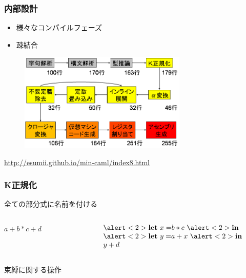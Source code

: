 \documentclass[dvipdfmx,cjk,xcolor=dvipsnames,envcountsect,notheorems,12pt]{beamer}
\theoremstyle{definition}
\newcommand{\keyword}[1]{\mathbf{#1}}
\newcommand{\LET}{\keyword{let}}
\newcommand{\IN}{\keyword{in}}
\begin{document}
\begin{frame}
	\frametitle{内部設計}
	\begin{itemize}
		\item 様々なコンパイルフェーズ
		\item 疎結合
	\end{itemize}

	\begin{figure}[htb]
		\centering
		\includegraphics[width=8cm,clip]{mincaml.png}
	\end{figure}
	{\footnotesize \url{http://esumii.github.io/min-caml/index8.html}}
\end{frame}

\begin{frame}
	\frametitle{K正規化}
	\LARGE
	全ての部分式に名前を付ける

	\begin{columns}
		\begin{column}{0.5\textwidth}
			\begin{center}
				$a+b*c+d$
			\end{center}
		\end{column}
		\begin{column}{0.5\textwidth}
			\begin{center}
				\[
					\begin{array}{l}
						\alert<2>{\LET~x =} b * c~\alert<2>{\IN} \\
						\alert<2>{\LET~y =} a + x~\alert<2>{\IN} \\
						y + d
					\end{array}
				\]
			\end{center}
		\end{column}
	\end{columns}

	\vfill

	\alert<2>{束縛に関する操作}
	\pause
\end{frame}
\end{document}

